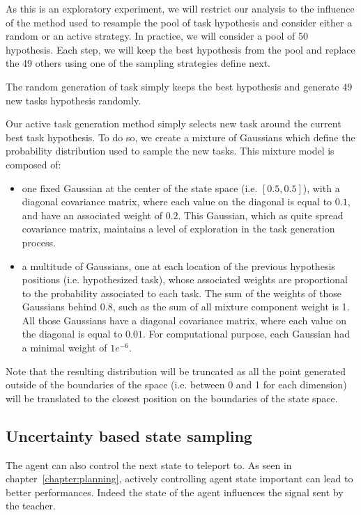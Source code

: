 As this is an exploratory experiment, we will restrict our analysis to the influence of the method used to resample the pool of task hypothesis and consider either a random or an active strategy. In practice, we will consider a pool of 50 hypothesis. Each step, we will keep the best hypothesis from the pool and replace the 49 others using one of the sampling strategies define next.

The random generation of task simply keeps the best hypothesis and generate 49 new tasks hypothesis randomly.

Our active task generation method simply selects new task around the current best task hypothesis. To do so, we create a mixture of Gaussians which define the probability distribution used to sample the new tasks. This mixture model is composed of:
\begin{itemize}
\item  one fixed Gaussian at the center of the state space (i.e. $[0.5, 0.5]$), with a diagonal covariance matrix, where each value on the diagonal is equal to $0.1$, and have an associated weight of $0.2$. This Gaussian, which as quite spread covariance matrix, maintains a level of exploration in the task generation process.
\item a multitude of Gaussians, one at each location of the previous hypothesis positions (i.e. hypothesized task), whose associated weights are proportional to the probability associated to each task. The sum of the weights of those Gaussians behind 0.8, such as the sum of all mixture component weight is 1. All those Gaussians have a diagonal covariance matrix, where each value on the diagonal is equal to $0.01$. For computational purpose, each Gaussian had a minimal weight of $1e^{-6}$.
\end{itemize}
Note that the resulting distribution will be truncated as all the point generated outside of the boundaries of the space (i.e. between 0 and 1 for each dimension) will be translated to the closest position on the boundaries of the state space.

\subsection{Uncertainty based state sampling}

The agent can also control the next state to teleport to. As seen in chapter~\ref{chapter:planning}, actively controlling agent state important can lead to better performances. Indeed the state of the agent influences the signal sent by the teacher. 

